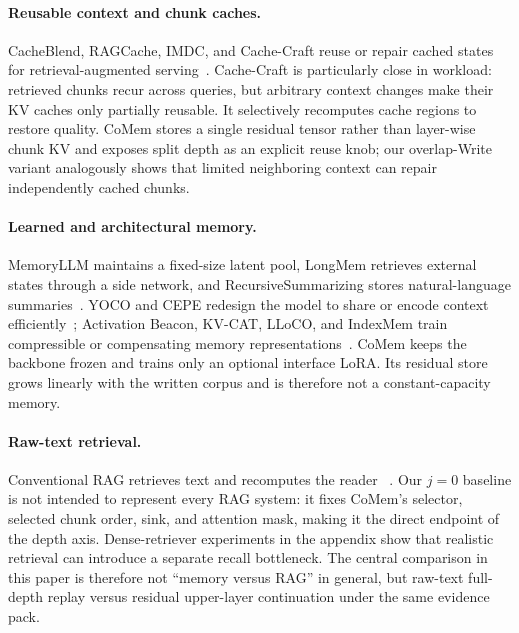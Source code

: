 \paragraph{Reusable context and chunk caches.}
CacheBlend, RAGCache, IMDC, and Cache-Craft reuse or repair cached states for
retrieval-augmented serving~\citep{cacheblend,ragcache,imdc,cachecraft}.
Cache-Craft is particularly close in workload: retrieved chunks recur across
queries, but arbitrary context changes make their KV caches only partially
reusable. It selectively recomputes cache regions to restore quality. CoMem
stores a single residual tensor rather than layer-wise chunk KV and exposes
split depth as an explicit reuse knob; our overlap-Write variant analogously
shows that limited neighboring context can repair independently cached chunks.

\paragraph{Learned and architectural memory.}
MemoryLLM maintains a fixed-size latent pool, LongMem retrieves external states
through a side network, and RecursiveSummarizing stores natural-language
summaries~\citep{memoryllm,longmem,recsum}. YOCO and CEPE redesign the model to
share or encode context efficiently~\citep{yoco,cepe}; Activation Beacon,
KV-CAT, LLoCO, and IndexMem train compressible or compensating memory
representations~\citep{actbeacon,kvcat,lloco,indexmem}. CoMem keeps the backbone
frozen and trains only an optional interface LoRA. Its residual store grows
linearly with the written corpus and is therefore not a constant-capacity memory.

\paragraph{Raw-text retrieval.}
Conventional RAG retrieves text and recomputes the reader
~\citep{rag,xu2024retrievallong}. Our $j{=}0$ baseline is not intended to
represent every RAG system: it fixes CoMem's selector, selected chunk order,
sink, and attention mask, making it the direct endpoint of the depth axis.
Dense-retriever experiments in the appendix show that realistic retrieval can
introduce a separate recall bottleneck. The central comparison in this paper is
therefore not ``memory versus RAG'' in general, but raw-text full-depth replay
versus residual upper-layer continuation under the same evidence pack.
